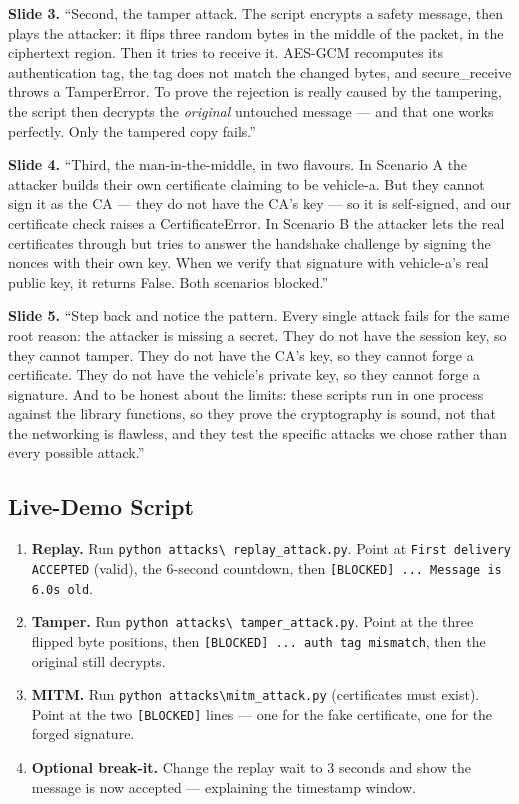 \documentclass[11pt,a4paper]{report}
\begin{document}
\textbf{Slide 3.} ``Second, the tamper attack. The script encrypts a safety
message, then plays the attacker: it flips three random bytes in the middle of
the packet, in the ciphertext region. Then it tries to receive it. AES-GCM
recomputes its authentication tag, the tag does not match the changed bytes, and
secure\_receive throws a TamperError. To prove the rejection is really caused by
the tampering, the script then decrypts the \emph{original} untouched message ---
and that one works perfectly. Only the tampered copy fails.''

\textbf{Slide 4.} ``Third, the man-in-the-middle, in two flavours. In Scenario A
the attacker builds their own certificate claiming to be vehicle-a. But they
cannot sign it as the CA --- they do not have the CA's key --- so it is
self-signed, and our certificate check raises a CertificateError. In Scenario B
the attacker lets the real certificates through but tries to answer the handshake
challenge by signing the nonces with their own key. When we verify that signature
with vehicle-a's real public key, it returns False. Both scenarios blocked.''

\textbf{Slide 5.} ``Step back and notice the pattern. Every single attack fails
for the same root reason: the attacker is missing a secret. They do not have the
session key, so they cannot tamper. They do not have the CA's key, so they cannot
forge a certificate. They do not have the vehicle's private key, so they cannot
forge a signature. And to be honest about the limits: these scripts run in one
process against the library functions, so they prove the cryptography is sound,
not that the networking is flawless, and they test the specific attacks we chose
rather than every possible attack.''

\subsection{Live-Demo Script}
\begin{enumerate}
  \item \textbf{Replay.} Run \texttt{python attacks\textbackslash
        replay\_attack.py}. Point at \texttt{First delivery ACCEPTED} (valid),
        the 6-second countdown, then \texttt{[BLOCKED] ... Message is 6.0s old}.
  \item \textbf{Tamper.} Run \texttt{python attacks\textbackslash
        tamper\_attack.py}. Point at the three flipped byte positions, then
        \texttt{[BLOCKED] ... auth tag mismatch}, then the original still decrypts.
  \item \textbf{MITM.} Run \texttt{python attacks\textbackslash mitm\_attack.py}
        (certificates must exist). Point at the two \texttt{[BLOCKED]} lines ---
        one for the fake certificate, one for the forged signature.
  \item \textbf{Optional break-it.} Change the replay wait to 3 seconds and show
        the message is now accepted --- explaining the timestamp window.
\end{enumerate}
\end{document}
